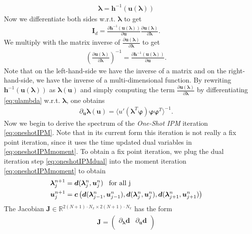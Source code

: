 \documentclass[10pt, a4paper, titlepage, bibliography=totocnumbered]{article}
\newenvironment{proof}[1][Proof]{\begin{trivlist}
\item[\hskip \labelsep {\bfseries #1}]}{\end{trivlist}}
\begin{document}
\begin{proof}
\begin{align}\label{eq:lambdau}
\bm{\lambda} = \bm{h}^{-1}(\bm{u}(\bm{\lambda}))
\end{align}
Now we differentiate both sides w.r.t. $\bm{\lambda}$ to get
\begin{align*}
\bm{I}_{d} = \frac{\partial \bm{h}^{-1}(\bm{u}(\bm{\lambda}))}{\partial \bm{u}}\frac{\partial \bm{u}(\bm{\lambda})}{\partial \bm{\lambda}}.
\end{align*}
We multiply with the matrix inverse of $\frac{\partial \bm{u}(\bm{\lambda})}{\partial \bm{\lambda}}$ to get
\begin{align*}
\left(\frac{\partial \bm{u}(\bm{\lambda})}{\partial \bm{\lambda}}\right)^{-1} = \frac{\partial \bm{h}^{-1}(\bm{u}(\bm{\lambda}))}{\partial \bm{u}}.
\end{align*}
Note that on the left-hand-side we have the inverse of a matrix and on the right-hand-side, we have the inverse of a multi-dimensional function. By rewriting $\bm{h}^{-1}(\bm{u}(\bm{\lambda}))$ as $\bm{\lambda}(\bm{u})$ and simply computing the term $\frac{\partial \bm{u}(\bm{\lambda})}{\partial \bm{\lambda}}$ by differentiating \eqref{eq:ulambda} w.r.t. $\bm{\lambda}$, one obtains
\begin{align}\label{eq:dudlambdaex}
\partial_{\bm{u}} \bm{\lambda}(\bm{u}) = \langle u'(\bm{\lambda}^T\bm{\varphi})\bm{\varphi}\bm{\varphi}^T\rangle^{-1}.
\end{align}
Now we begin to derive the spectrum of the \textit{One-Shot IPM} iteration \eqref{eq:oneshotIPM}. Note that in its current form this iteration is not really a fix point iteration, since it uses the time updated dual variables in \eqref{eq:oneshotIPMmoment}. To obtain a fix point iteration, we plug the dual iteration step \eqref{eq:oneshotIPMdual} into the moment iteration \eqref{eq:oneshotIPMmoment} to obtain
\begin{align*}
&\bm{\lambda}_j^{n+1} = \bm{d}(\bm{\lambda}_j^{n},\bm{u}_j^{n}) \enskip \text{ for all j} \\
&\bm{u}_j^{n+1} =  \bm{c}\left(\bm{d}(\bm{\lambda}_{j-1}^{n},\bm{u}_{j-1}^{n}),\bm{d}(\bm{\lambda}_{j}^{n},\bm{u}_{j}^{n}),\bm{d}(\bm{\lambda}_{j+1}^{n},\bm{u}_{j+1}^{n})\right)
\end{align*}
The Jacobian $\bm{J}\in\mathbb{R}^{2(N+1)\cdot N_x \times 2(N+1)\cdot N_x}$ has the form
\begin{align}\label{eq:Jacobian}
\bm{J} = 
\begin{pmatrix}
 \partial_{\bm{\lambda}} \bm{d} & \partial_{\bm{u}} \bm{d}  \\

\end{pmatrix}
\end{align}
\end{proof}
\end{document}
